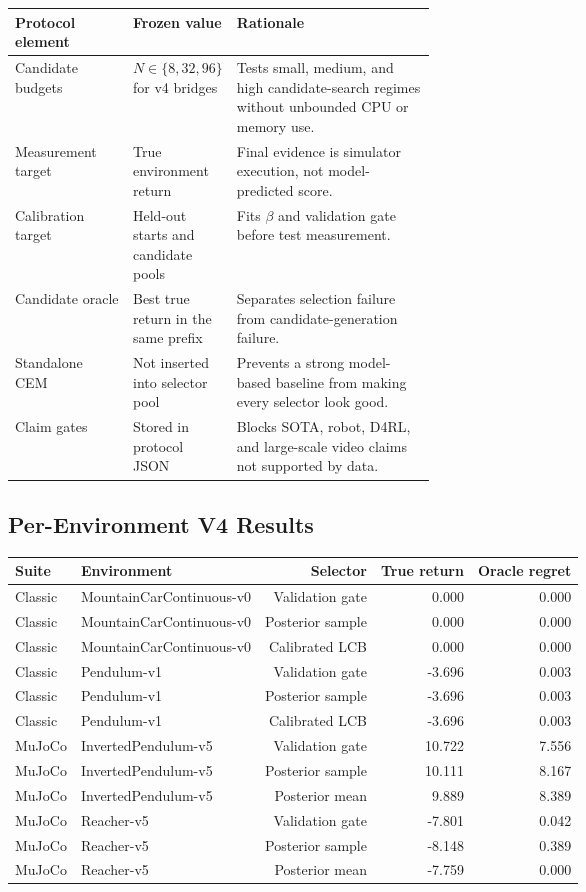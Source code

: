 \documentclass{article}
\begin{document}
\begin{center}
\small
\begin{tabularx}{\linewidth}{p{0.28\linewidth}p{0.21\linewidth}X}
\toprule
Protocol element & Frozen value & Rationale \\
\midrule
Candidate budgets & $N\in\{8,32,96\}$ for v4 bridges &
Tests small, medium, and high candidate-search regimes without unbounded CPU
or memory use. \\
Measurement target & True environment return &
Final evidence is simulator execution, not model-predicted score. \\
Calibration target & Held-out starts and candidate pools &
Fits $\beta$ and validation gate before test measurement. \\
Candidate oracle & Best true return in the same prefix &
Separates selection failure from candidate-generation failure. \\
Standalone CEM & Not inserted into selector pool &
Prevents a strong model-based baseline from making every selector look good. \\
Claim gates & Stored in protocol JSON &
Blocks SOTA, robot, D4RL, and large-scale video claims not supported by data. \\
\bottomrule
\end{tabularx}
\end{center}

\subsection{Per-Environment V4 Results}

\begin{center}
\small
\begin{tabular}{llrrr}
\toprule
Suite & Environment & Selector & True return & Oracle regret \\
\midrule
Classic & MountainCarContinuous-v0 & Validation gate & 0.000 & 0.000 \\
Classic & MountainCarContinuous-v0 & Posterior sample & 0.000 & 0.000 \\
Classic & MountainCarContinuous-v0 & Calibrated LCB & 0.000 & 0.000 \\
Classic & Pendulum-v1 & Validation gate & -3.696 & 0.003 \\
Classic & Pendulum-v1 & Posterior sample & -3.696 & 0.003 \\
Classic & Pendulum-v1 & Calibrated LCB & -3.696 & 0.003 \\
MuJoCo & InvertedPendulum-v5 & Validation gate & 10.722 & 7.556 \\
MuJoCo & InvertedPendulum-v5 & Posterior sample & 10.111 & 8.167 \\
MuJoCo & InvertedPendulum-v5 & Posterior mean & 9.889 & 8.389 \\
MuJoCo & Reacher-v5 & Validation gate & -7.801 & 0.042 \\
MuJoCo & Reacher-v5 & Posterior sample & -8.148 & 0.389 \\
MuJoCo & Reacher-v5 & Posterior mean & -7.759 & 0.000 \\
\bottomrule
\end{tabular}
\end{center}
\end{document}
